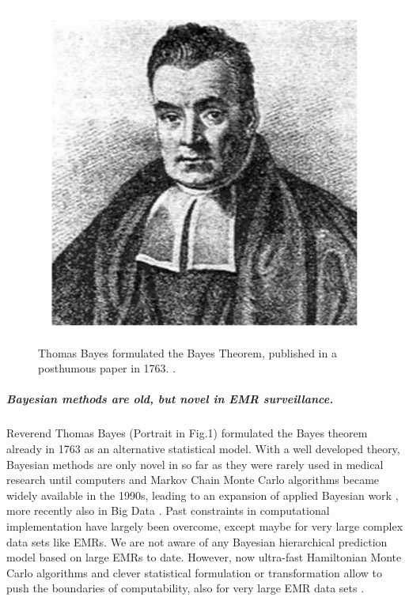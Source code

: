 \documentclass[11pt,notitlepage]{article}
\begin{document}
\begin{figure} %
 \vspace{-20pt}
 \includegraphics[scale=0.15]{Figures/Thomas_Bayes.pdf}
  \vspace{-10pt}
 \caption{\footnotesize Thomas Bayes formulated the Bayes Theorem, published in a posthumous paper in 1763. \cite{Thomas_Bayes}.}
 \vspace{-20pt}
\end{figure} 

\subparagraph*{Bayesian methods are old, but novel in EMR surveillance.}
Reverend Thomas Bayes (Portrait in Fig.1)\cite{Thomas_Bayes} formulated the Bayes theorem already in 1763 as an alternative statistical model. With a well developed theory, Bayesian methods are only novel in so far as they were rarely used in medical research until computers and Markov Chain Monte Carlo algorithms became widely available in the 1990s, leading to an expansion of applied Bayesian work \cite{Ashby_16947924,Spiegelhalter_11134920}, more recently also in Big Data \cite{Yoo_24987556}. Past constraints in computational implementation have largely been overcome, except maybe for very large complex data sets like EMRs. We are not aware of any Bayesian hierarchical prediction model based on large EMRs to date. However, now ultra-fast Hamiltonian Monte Carlo algorithms \cite{Stan_Software_2014} and clever statistical formulation or transformation allow to push the boundaries of computability, also for very large EMR data sets \cite{Gelman-Hill_2014}.  
\end{document}
